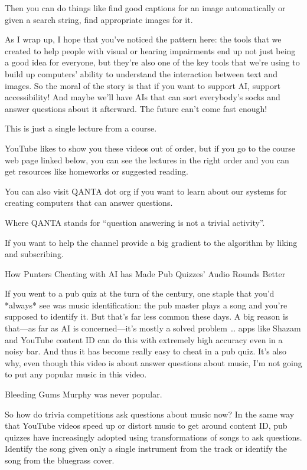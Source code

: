 Then you can do things like find good captions for an image automatically or given a search string, find appropriate images for it.

As I wrap up, I hope that you’ve noticed the pattern here: the tools that we created to help people with visual or hearing impairments end up not just being a good idea for everyone, but they’re also one of the key tools that we’re using to build up computers’ ability to understand the interaction between text and images.  So the moral of the story is that if you want to support AI, support accessibility!  And maybe we’ll have AIs that can sort everybody’s socks and answer questions about it afterward.  The future can’t come fast enough!

This is just a single lecture from a course.

YouTube likes to show you these videos out of order, but if you go to the course web page linked below, you can see the lectures in the right order and you can get resources like homeworks or suggested reading.

You can also visit QANTA dot org
if you want to learn about our systems for creating computers that can answer questions.

Where QANTA stands for “question answering is not a trivial activity”.

If you want to help the channel provide a big gradient to the algorithm by liking and subscribing.


How Punters Cheating with AI has Made Pub Quizzes' Audio Rounds Better

If you went to a pub quiz at the turn of the century, one staple that you’d *always* see was music identification: the pub master plays a song and you’re supposed to identify it.  But that’s far less common these days.  A big reason is that—as far as AI is concerned—it’s mostly a solved problem … apps like Shazam and YouTube content ID can do this with extremely high accuracy even in a noisy bar.  And thus it has become really easy to cheat in a pub quiz.  It’s also why, even though this video is about answer questions about music, I’m not going to put any popular music in this video. 

Bleeding Gums Murphy was never popular.


So how do trivia competitions ask questions about music now?  In the same way that YouTube videos speed up or distort music to get around content ID, pub quizzes have increasingly adopted using transformations of songs to ask questions.  Identify the song given only a single instrument from the track or identify the song from the bluegrass cover.

